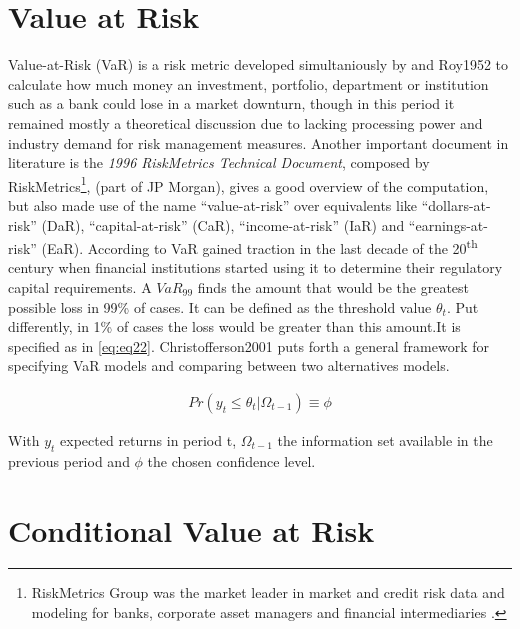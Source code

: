 \documentclass[a4paper, twoside]{templates/ociamthesis}
\begin{document}
\hypertarget{value-at-risk}{%
\section{Value at Risk}\label{value-at-risk}}

Value-at-Risk (VaR) is a risk metric developed simultaniously by \textcite{markowitz1952} and Roy1952 to calculate how much money an investment, portfolio, department or institution such as a bank could lose in a market downturn, though in this period it remained mostly a theoretical discussion due to lacking processing power and industry demand for risk management measures. Another important document in literature is the \emph{1996 RiskMetrics Technical Document}, composed by RiskMetrics\footnote{RiskMetrics Group was the market leader in market and credit risk data and modeling for banks, corporate asset managers and financial intermediaries \autocite{alexander2008}.}, \textcite{morganguarantytrustcompany1996} (part of JP Morgan), gives a good overview of the computation, but also made use of the name ``value-at-risk'' over equivalents like ``dollars-at-risk'' (DaR), ``capital-at-risk'' (CaR), ``income-at-risk'' (IaR) and ``earnings-at-risk'' (EaR). According to \textcite{holton2002} VaR gained traction in the last decade of the 20\textsuperscript{th} century when financial institutions started using it to determine their regulatory capital requirements. A \(VaR_{99}\) finds the amount that would be the greatest possible loss in 99\% of cases. It can be defined as the threshold value \(\theta_t\). Put differently, in 1\% of cases the loss would be greater than this amount.It is specified as in \eqref{eq:eq22}. Christofferson2001 puts forth a general framework for specifying VaR models and comparing between two alternatives models.

\begin{align}
Pr(y_t \le \theta_t | \Omega_{t-1}) \equiv \phi
 \label{eq:eq22}
\end{align}

With \(y_t\) expected returns in period t, \(\Omega_{t-1}\) the information set available in the previous period and \(\phi\) the chosen confidence level.

\hypertarget{conditional-value-at-risk}{%
\section{Conditional Value at Risk}\label{conditional-value-at-risk}}
\end{document}
